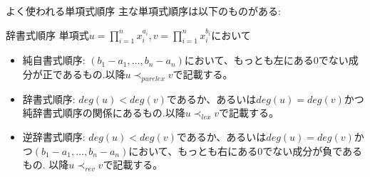 \begin{frame} {よく使われる単項式順序}
	主な単項式順序は以下のものがある:
	\begin{definition} {辞書式順序}
		単項式$u=\prod_{i=1}^n x_i^{a_i}, v = \prod_{i=1}^n x_i^{b_i}$において
		\begin{itemize}
			\item 純自書式順序: $(b_1-a_1, \ldots, b_n-a_n)$において、もっとも左にある0でない成分が正であるもの.以降$u \prec_{purelex} v$で記載する。
			\item 辞書式順序: $deg(u)<deg(v)$であるか、あるいは$deg(u)=deg(v)$かつ純辞書式順序の関係にあるもの.以降$u \prec_{lex} v$で記載する。
			\item 逆辞書式順序: $deg(u)<deg(v)$であるか、あるいは$deg(u)=deg(v)$かつ$(b_1-a_1, \ldots, b_n-a_n)$において、もっとも右にある0でない成分が負であるもの.
			      以降$u \prec_{rev} v$で記載する。
		\end{itemize}
	\end{definition}
\end{frame}
